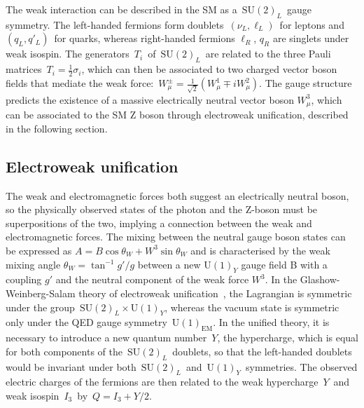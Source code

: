 The weak interaction can be described in the SM as a~$\mathrm{SU}(2)_L$~gauge symmetry. The left-handed fermions form doublets~$(\nu_L, \mathrm{\ell}_L)$~for leptons and~$(q_L, q'_L)$~for quarks, whereas right-handed fermions $\ell_R$, $q_R$ are singlets under weak isospin. The generators~$T_i$~of~$\mathrm{SU}(2)_L$~are related to the three Pauli matrices~$T_i = \frac{1}{2}\sigma_i$, which can then be associated to two charged vector boson fields that mediate the weak force:~$W^{\pm}_\mu=\frac{1}{\sqrt{2}}(W^1_\mu \mp i W^2_\mu)$. The gauge structure predicts the existence of a massive electrically neutral vector boson $W^3_\mu$, which can be associated to the SM Z boson through electroweak unification, described in the following section.

\subsection{Electroweak unification}

The weak and electromagnetic forces both suggest an electrically neutral boson, so the physically observed states of the photon and the Z-boson must be superpositions of the two, implying a connection between the weak and electromagnetic forces. The mixing between the neutral gauge boson states can be expressed as $A = B \cos{\theta_W} + W^3 \sin{\theta_W}$ and is characterised by the weak mixing angle $\theta_W = \tan^{-1}{g'/g}$ between a new $\mathrm{U}(1)_Y$ gauge field B with a coupling $g'$ and the neutral component of the weak force $W^3$. In the Glashow-Weinberg-Salam theory of electroweak unification~\cite{Glashow:1961tr,PhysRevLett.19.1264,Salam:1968rm}, the Lagrangian is symmetric under the group~$\mathrm{SU}(2)_L \times \mathrm{U}(1)_Y$, whereas the vacuum state is symmetric only under the QED gauge symmetry~$\mathrm{U}(1)_{\mathrm{EM}}$. In the unified theory, it is necessary to introduce a new quantum number~$Y$, the hypercharge, which is equal for both components of the~$\mathrm{SU}(2)_L$~doublets, so that the left-handed doublets would be invariant under both~$\mathrm{SU}(2)_L$~and~$\mathrm{U}(1)_Y$~symmetries. The observed electric charges of the fermions are then related to the weak hypercharge~$Y$~and weak isospin~$I_3$~by~$Q = I_3 + Y/2$.

